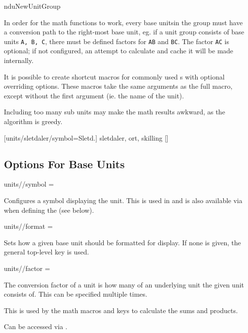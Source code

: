 \documentclass[
	a4paper,
	margin=4cm
]{article}
\begin{document}
\begin{docCommand}
	{nduNewUnitGroup}
	{}

	In order for the math functions to work, every base unitsin the group must have a conversion path to the right-most base unit, eg. if a unit group consists of base units \texttt{A, B, C}, there must be defined factors for \texttt{A\rightarrow B} and \texttt{B\rightarrow C}. The factor \texttt{A\rightarrow C} is optional; if not configured, an attempt to calculate and cache it will be made internally.

	It is possible to create shortcut macros for commonly used s with optional overriding options. These macros take the same arguments as the full  macro, except without the first argument (ie. the name of the unit).
	
	Including too many sub units may make the math results awkward, as the algorithm is greedy. %

\begin{dispExample}
	[units/sletdaler/symbol={Sletd.}]
	{sletdaler, ort, skilling}
	[\mySldl]
\end{dispExample}

\end{docCommand}

\clearpage
\subsection{Options For Base Units}

\begin{docKey}
	[]
	[doc label=units:symbol]
	{units//symbol}
	{=}
	{}

	Configures a symbol displaying the unit. This is used in  and is also available via  when defining the  (see below).
\end{docKey}

\begin{docKey}
	[]
	[doc label=units:format]
	{units//format}
	{=}
	{}

	Sets how a given base unit should be formatted for display. If none is given, the general top-level  key is used.
\end{docKey}

\begin{docKey}
	[]
	[doc label=units:factor]
	{units//factor}
	{= }
	{}
	
	The conversion factor of a unit is how many of an underlying unit the given unit consists of. This can be specified multiple times.
	
	This is used by the math macros and keys to calculate the sums and products.
	
	Can be accessed via .
\end{docKey}
\end{document}
